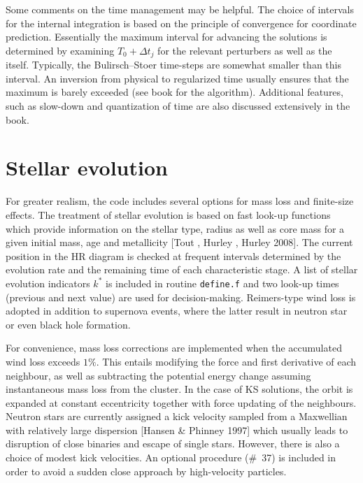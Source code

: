 \documentclass[12pt]{article}
\begin{document}
Some comments on the time management may be helpful.
The choice of intervals for the internal integration is based on the
principle of convergence for coordinate prediction.
Essentially the maximum interval for advancing the solutions is determined
by examining $T_0 + {\Delta t}_j$ for the relevant perturbers as well as the
\cm itself.
Typically, the Bulirsch--Stoer time-steps are somewhat smaller than this
interval.
An inversion from physical to regularized time usually ensures that the
maximum is barely exceeded (see book for the algorithm).
Additional features, such as slow-down and quantization of time are also
discussed extensively in the book.

\section{Stellar evolution}

For greater realism, the code includes several options for mass loss and
finite-size effects.
The treatment of stellar evolution is based on fast look-up functions
which provide information on the stellar type, radius as well as core mass
for a given initial mass, age and metallicity [Tout ,
Hurley , Hurley 2008].
The current position in the HR diagram is checked at frequent intervals
determined by the evolution rate and the remaining time of each
characteristic stage.
A list of stellar evolution indicators $k^{\ast}$ is included in routine
{\tt define.f} and two look-up times (\ie previous and next value) are used
for decision-making.
Reimers-type wind loss is adopted in addition to supernova events, where the
latter result in neutron star or even black hole formation.

For convenience, mass loss corrections are implemented when the accumulated
wind loss exceeds $1\%$.
This entails modifying the force and first derivative of each neighbour, as
well as subtracting the potential energy change assuming instantaneous mass
loss from the cluster.
In the case of KS solutions, the orbit is expanded at constant eccentricity
together with force updating of the \cm neighbours.
Neutron stars are currently assigned a kick velocity sampled from a
Maxwellian with relatively large dispersion [\cf Hansen \& Phinney 1997]
which usually leads to disruption of close binaries and escape of single
stars.
However, there is also a choice of modest kick velocities.
An optional procedure (\#~37) is included in order to avoid a sudden close
approach by high-velocity particles.
\end{document}
